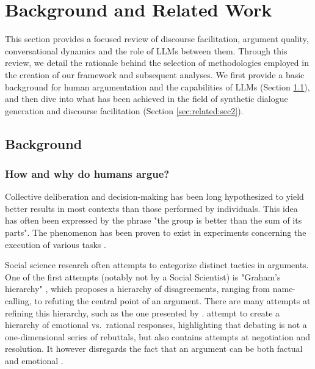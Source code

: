 %
\chapter{Background and Related Work}
\label{sec:related}

This section provides a focused review of discourse facilitation, argument quality, conversational dynamics and the role of LLMs between them. Through this review, we detail the rationale behind the selection of methodologies employed in the creation of our framework and subsequent analyses. We first provide a basic background for human argumentation and the capabilities of LLMs (Section \ref{sec:related:sec1}), and then dive into what has been achieved in the field of synthetic dialogue generation and discourse facilitation (Section \ref{sec:related:sec2}).


\section{Background}
\label{sec:related:sec1}

\subsection{How and why do humans argue?}
\label{sec:background:arguments-how}

Collective deliberation and decision-making has been long hypothesized to yield better results in most contexts than those performed by individuals. This idea has often been expressed by the phrase "the group is better than the sum of its parts". The phenomenon has been proven to exist in experiments concerning the execution of various tasks \cite{david-collaborative, stefan-dissent}.

Social science research often attempts to categorize distinct tactics in arguments. One of the first attempts (notably not by a Social Scientist) is "Graham's hierarchy" \cite{graham2008disagree}, which proposes a hierarchy of disagreements, ranging from name-calling, to refuting the central point of an argument. There are many attempts at refining this hierarchy, such as the one presented by \citet{benesch2016counterspeech}. \citet{walker-etal-2012-corpus} attempt to create a hierarchy of emotional vs.\ rational responses, highlighting that debating is not a one-dimensional series of rebuttals, but also contains attempts at negotiation and resolution. It however disregards the fact that an argument can be both factual and emotional \cite{dekock2022disagree}.

